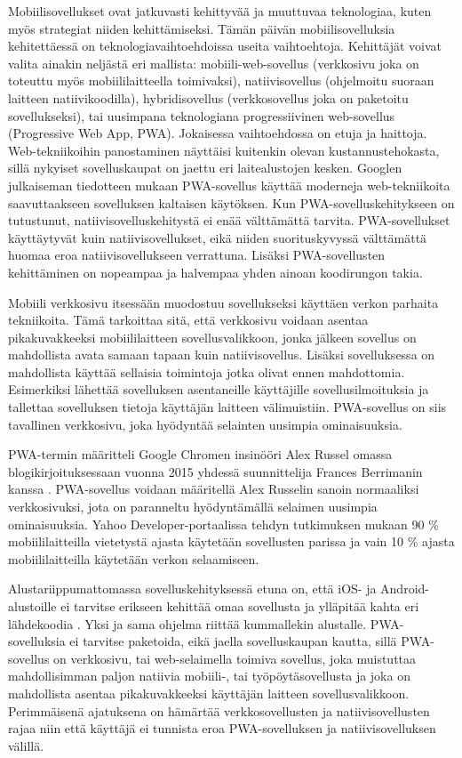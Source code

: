 \documentclass{tktltiki}
\begin{document}
Mobiilisovellukset ovat jatkuvasti kehittyvää ja muuttuvaa teknologiaa, kuten myös strategiat niiden kehittämiseksi. Tämän päivän mobiilisovelluksia kehitettäessä on teknologiavaihtoehdoissa useita vaihtoehtoja. Kehittäjät voivat valita ainakin neljästä eri mallista: mobiili-web-sovellus (verkkosivu joka on toteuttu myös mobiililaitteella toimivaksi), natiivisovellus (ohjelmoitu suoraan laitteen natiivikoodilla), hybridisovellus (verkkosovellus joka on paketoitu sovellukseksi), tai uusimpana teknologiana progressiivinen web-sovellus (Progressive Web App, PWA). Jokaisessa vaihtoehdossa on etuja ja haittoja. Web-tekniikoihin panostaminen näyttäisi kuitenkin olevan kustannustehokasta, sillä nykyiset sovelluskaupat on jaettu eri laitealustojen kesken. Googlen julkaiseman tiedotteen mukaan \cite{Gambhir} PWA-sovellus käyttää moderneja web-tekniikoita saavuttaakseen sovelluksen kaltaisen käytöksen. Kun PWA-sovelluskehitykseen on tutustunut, natiivisovelluskehitystä ei enää välttämättä tarvita. PWA-sovellukset käyttäytyvät kuin natiivisovellukset, eikä niiden suorituskyvyssä välttämättä huomaa eroa natiivisovellukseen verrattuna. Lisäksi PWA-sovellusten kehittäminen on nopeampaa ja halvempaa yhden ainoan koodirungon takia. 

Mobiili verkkosivu itsessään muodostuu sovellukseksi käyttäen verkon parhaita tekniikoita. Tämä tarkoittaa sitä, että verkkosivu voidaan asentaa pikakuvakkeeksi mobiililaitteen sovellusvalikkoon, jonka jälkeen sovellus on mahdollista avata samaan tapaan kuin natiivisovellus. Lisäksi sovelluksessa on mahdollista käyttää sellaisia toimintoja jotka olivat ennen mahdottomia. Esimerkiksi lähettää sovelluksen asentaneille käyttäjille sovellusilmoituksia ja tallettaa sovelluksen tietoja käyttäjän laitteen välimuistiin. PWA-sovellus on siis tavallinen verkkosivu, joka hyödyntää selainten uusimpia ominaisuuksia.

PWA-termin määritteli Google Chromen insinööri Alex Russel \cite{Russell, biorn2017progressive} omassa blogikirjoituksessaan vuonna 2015 yhdessä suunnittelija Frances Berrimanin kanssa \cite{tandelimpact}. PWA-sovellus voidaan määritellä Alex Russelin sanoin normaaliksi verkkosivuksi, jota on paranneltu hyödyntämällä selaimen uusimpia ominaisuuksia. Yahoo Developer-portaalissa tehdyn tutkimuksen mukaan \cite{Khalaf} 90 \% mobiililaitteilla vietetystä ajasta käytetään sovellusten parissa ja vain 10 \% ajasta mobiililaitteilla käytetään verkon selaamiseen. 

Alustariippumattomassa sovelluskehityksessä etuna on, että iOS- ja Android-alustoille ei tarvitse erikseen kehittää omaa sovellusta ja ylläpitää kahta eri lähdekoodia \cite{xanthopoulos2013comparative}. Yksi ja sama ohjelma riittää kummallekin alustalle. PWA-sovelluksia ei tarvitse paketoida, eikä jaella sovelluskaupan kautta, sillä PWA-sovellus on verkkosivu, tai web-selaimella toimiva sovellus, joka muistuttaa mahdollisimman paljon natiivia mobiili-, tai työpöytäsovellusta ja joka on mahdollista asentaa pikakuvakkeeksi käyttäjän laitteen sovellusvalikkoon. Perimmäisenä ajatuksena on hämärtää verkkosovellusten ja natiivisovellusten rajaa niin että käyttäjä ei tunnista eroa PWA-sovelluksen ja natiivisovelluksen välillä.
\end{document}
